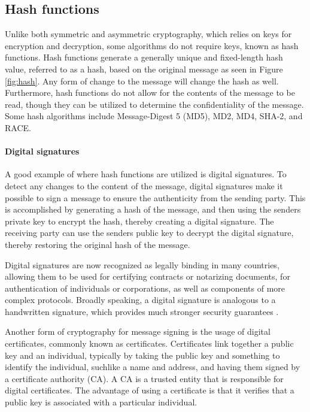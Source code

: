 \subsection{Hash functions}
Unlike both symmetric and asymmetric cryptography, which relies on keys for encryption and decryption, some algorithms do not require keys, known as hash functions. Hash functions generate a generally unique and fixed-length hash value, referred to as a hash, based on the original message as seen in Figure \ref{fig:hash}. Any form of change to the message will change the hash as well. Furthermore, hash functions do not allow for the contents of the message to be read, though they can be utilized to determine the confidentiality of the message. Some hash algorithms include Message-Digest 5 (MD5), MD2, MD4, SHA-2, and RACE. 


\paragraph{Digital signatures}
A good example of where hash functions are utilized is digital signatures. To detect any changes to the content of the message, digital signatures make it possible to sign a message to ensure the authenticity from the sending party. This is accomplished by generating a hash of the message, and then using the senders private key to encrypt the hash, thereby creating a digital signature. The receiving party can use the senders public key to decrypt the digital signature, thereby restoring the original hash of the message.

Digital signatures are now recognized as legally binding in many countries, allowing them to be used for certifying contracts or notarizing documents, for authentication of individuals or corporations, as well as components of more complex protocols. Broadly speaking, a digital signature is analogous to a handwritten signature, which provides much stronger security guarantees \cite{katz2010digital}. 

Another form of cryptography for message signing is the usage of digital certificates, commonly known as certificates. Certificates link together a public key and an individual, typically by taking the public key and something to identify the individual, suchlike a name and address, and having them signed by a certificate authority (CA). A CA is a trusted entity that is responsible for digital certificates. The advantage of using a certificate is that it verifies that a public key is associated with a particular individual.

